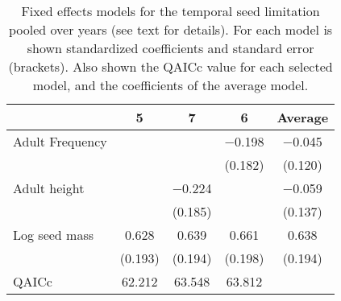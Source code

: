 \begin{table}
\label{tab:TSL_glm}
\caption{Fixed effects models for the temporal seed limitation pooled over years (see text for details). For each model is shown standardized coefficients and standard error (brackets). Also shown  the QAICc value for each selected model, and the coefficients of the average model.}
\centering
\begin{tabular}[t]{lcccc}
\toprule
  & 5 & 7 & 6 & Average\\
\midrule
Adult Frequency &  &  & \num{-0.198} & \num{-0.045}\\
 &  &  & (\num{0.182}) & (\num{0.120})\\
Adult height &  & \num{-0.224} &  & \num{-0.059}\\
 &  & (\num{0.185}) &  & (\num{0.137})\\
Log seed mass & \num{0.628} & \num{0.639} & \num{0.661} & \num{0.638}\\
 & (\num{0.193}) & (\num{0.194}) & (\num{0.198}) & (\num{0.194})\\
\midrule
QAICc & \num{62.212} & \num{63.548} & \num{63.812} & \\
\bottomrule
\end{tabular}
\end{table}
